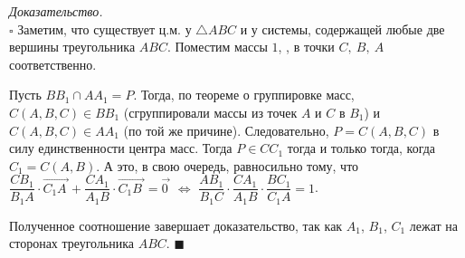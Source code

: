 \documentclass[14pt]{extarticle}
\let\Overrightarrow\overrightarrow
\theoremstyle{definition}
\theoremstyle{theorem}
\renewenvironment{proof}
    {\noindent \textit{Доказательство.}\\
	\indent $\square$}
	{ $\blacksquare$\\ }
\begin{document}
\begin{proof}
    Заметим, что существует ц.м. у \(\triangle ABC\) и у системы, 
    содержащей любые две вершины треугольника \(ABC\).
	Поместим массы \(1\), 
	,
	в точки $C, \: B, \: A$ соответственно.
    
    Пусть \(BB_1 \cap AA_1 = P\). Тогда, по теореме о группировке масс, 
    \(C(A, B, C) \in BB_1\) (сгруппировали массы из точек \(A\) и \(C\) 
    в \(B_1\)) и \(C(A, B, C) \in AA_1\) (по той же причине). Следовательно, 
    \(P = C(A, B, C)\) в силу единственности центра масс. 
    Тогда \(P \in CC_1\) тогда и только тогда, когда 
    \(C_1 = C(A, B)\). А это, в свою очередь, равносильно тому, что 
    \(\dfrac{CB_1}{B_1A} \cdot \Overrightarrow{C_1A_{\,}} + 
      \dfrac{CA_1}{A_1B} \cdot \Overrightarrow{C_1B_{\:}} = \Overrightarrow{0_{\,}}\)
    \(\iff\)
    \(\dfrac{AB_1}{B_1C} \cdot \dfrac{CA_1}{A_1B} \cdot \dfrac{BC_1}{C_1A} = 1\).
    
    Полученное соотношение завершает доказательство, так как \(A_1\), \(B_1\), 
    \(C_1\) лежат на сторонах треугольника \(ABC\).
\end{proof}
%    
    
   

\end{document}
